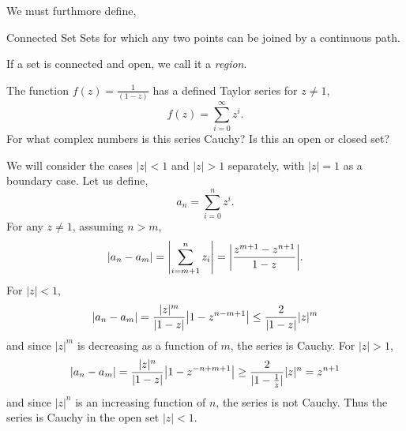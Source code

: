 \documentclass{book}
\begin{document}
We must furthmore define,
\begin{Definitions}{Connected Set}{}
	Sets for which any two points can be joined by a continuous path. 
\end{Definitions}
If a set is connected and open, we call it a \textit{region}.
\begin{Examples}{}
	The function $f(z) = \frac{1}{(1-z)}$ has a defined Taylor series for $z \neq 1$,
	\begin{equation}
		f(z) = \sum_{i=0}^{\infty}z^i.
	\end{equation}
	For what complex numbers is this series Cauchy? Is this an open or closed set?
\end{Examples}
We will consider the cases $|z| < 1$ and $|z| > 1$ separately, with $|z| =1$ as a boundary case. Let us define,
\begin{equation}
	a_n = \sum_{i=0}^n z^i.
\end{equation}
For any $z \neq 1$, assuming $n > m$,
\begin{equation}
	\abs{a_n - a_m} = \abs{\sum_{i = m+1}^n z_i } = \abs{\frac{z^{m+1}-z^{n+1}}{1-z}}.
\end{equation}
For $|z| < 1$,
\begin{equation}
	|a_n - a_m| = \frac{|z|^m}{|1-z|}\abs{1 - z^{n-m+1}}\leq \frac{2}{|1-z|}|z|^m
\end{equation}
and since $|z|^m$ is decreasing as a function of $m$, the series is Cauchy. For $|z|>1$,
\begin{equation}
	|a_n - a_m| = \frac{|z|^n}{|1-z|}\abs{1 - z^{-n+m+1}}\geq \frac{2}{|1-\frac{1}{z}|}|z|^n = z^{n+1}
\end{equation}
and since $|z|^{n}$ is an increasing function of $n$, the series is not Cauchy. Thus the series is Cauchy in the open set $|z| < 1$.
\end{document}
